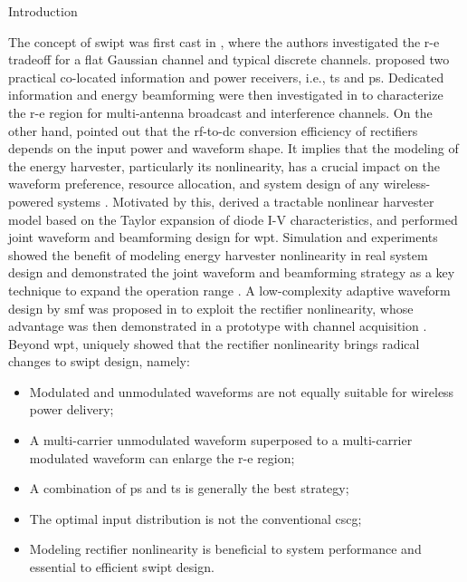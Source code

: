 \begin{section}{Introduction}
\begin{subsection}{}
		The concept of \gls{swipt} was first cast in \cite{Varshney2008}, where the authors investigated the \gls{r-e} tradeoff for a flat Gaussian channel and typical discrete channels. \cite{Zhou2013} proposed two practical co-located information and power receivers, i.e., \gls{ts} and \gls{ps}. Dedicated information and energy beamforming were then investigated in \cite{Zhang2013,Park2014} to characterize the \gls{r-e} region for multi-antenna broadcast and interference channels. On the other hand, \cite{Trotter2009} pointed out that the \gls{rf}-to-\gls{dc} conversion efficiency of rectifiers depends on the input power and waveform shape. It implies that the modeling of the energy harvester, particularly its nonlinearity, has a crucial impact on the waveform preference, resource allocation, and system design of any wireless-powered systems \cite{Trotter2009,Clerckx2018,Clerckx2019}. Motivated by this, \cite{Clerckx2016a} derived a tractable nonlinear harvester model based on the Taylor expansion of diode I-V characteristics, and performed joint waveform and beamforming design for \gls{wpt}. Simulation and experiments showed the benefit of modeling energy harvester nonlinearity in real system design \cite{Kim2019,Kim2020a} and demonstrated the joint waveform and beamforming strategy as a key technique to expand the operation range \cite{Kim2021}. A low-complexity adaptive waveform design by \gls{smf} was proposed in \cite{Clerckx2017} to exploit the rectifier nonlinearity, whose advantage was then demonstrated in a prototype with channel acquisition \cite{Kim2017}. Beyond \gls{wpt}, \cite{Clerckx2018b} uniquely showed that the rectifier nonlinearity brings radical changes to \gls{swipt} design, namely:
		\begin{itemize}
			\item Modulated and unmodulated waveforms are not equally suitable for wireless power delivery;
			\item A multi-carrier unmodulated waveform superposed to a multi-carrier modulated waveform can enlarge the \gls{r-e} region;
			\item A combination of \gls{ps} and \gls{ts} is generally the best strategy;
			\item The optimal input distribution is not the conventional \gls{cscg};
			\item Modeling rectifier nonlinearity is beneficial to system performance and essential to efficient \gls{swipt} design.
		\end{itemize}

\end{subsection}
\end{section}

